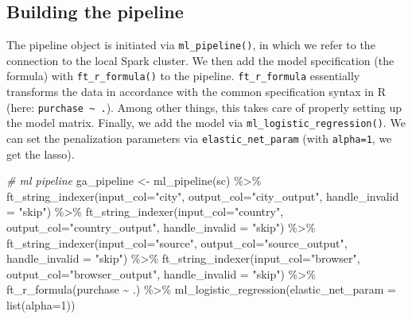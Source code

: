 \documentclass[
  12pt,
]{style/krantz}
\newenvironment{Shaded}{\begin{snugshade}}{\end{snugshade}}
\newcommand{\AttributeTok}[1]{\textcolor[rgb]{0.77,0.63,0.00}{#1}}
\newcommand{\CommentTok}[1]{\textcolor[rgb]{0.56,0.35,0.01}{\textit{#1}}}
\newcommand{\DecValTok}[1]{\textcolor[rgb]{0.00,0.00,0.81}{#1}}
\newcommand{\FunctionTok}[1]{\textcolor[rgb]{0.00,0.00,0.00}{#1}}
\newcommand{\NormalTok}[1]{#1}
\newcommand{\OtherTok}[1]{\textcolor[rgb]{0.56,0.35,0.01}{#1}}
\newcommand{\SpecialCharTok}[1]{\textcolor[rgb]{0.00,0.00,0.00}{#1}}
\newcommand{\StringTok}[1]{\textcolor[rgb]{0.31,0.60,0.02}{#1}}
\begin{document}
\hypertarget{building-the-pipeline}{%
\subsection{Building the pipeline}\label{building-the-pipeline}}

The pipeline object is initiated via \texttt{ml\_pipeline()}, in which we refer to the connection to the local Spark cluster. We then add the model specification (the formula) with \texttt{ft\_r\_formula()} to the pipeline. \texttt{ft\_r\_formula} essentially transforms the data in accordance with the common specification syntax in R (here: \texttt{purchase\ \textasciitilde{}\ .}). Among other things, this takes care of properly setting up the model matrix. Finally, we add the model via \texttt{ml\_logistic\_regression()}. We can set the penalization parameters via \texttt{elastic\_net\_param} (with \texttt{alpha=1}, we get the lasso).

\begin{Shaded}
\begin{Highlighting}[]
\CommentTok{\# ml pipeline}
\NormalTok{ga\_pipeline }\OtherTok{\textless{}{-}} 
     \FunctionTok{ml\_pipeline}\NormalTok{(sc) }\SpecialCharTok{\%\textgreater{}\%}
     \FunctionTok{ft\_string\_indexer}\NormalTok{(}\AttributeTok{input\_col=}\StringTok{"city"}\NormalTok{, }
                       \AttributeTok{output\_col=}\StringTok{"city\_output"}\NormalTok{,}
                       \AttributeTok{handle\_invalid =} \StringTok{"skip"}\NormalTok{) }\SpecialCharTok{\%\textgreater{}\%}
     \FunctionTok{ft\_string\_indexer}\NormalTok{(}\AttributeTok{input\_col=}\StringTok{"country"}\NormalTok{, }
                       \AttributeTok{output\_col=}\StringTok{"country\_output"}\NormalTok{,}
                       \AttributeTok{handle\_invalid =} \StringTok{"skip"}\NormalTok{) }\SpecialCharTok{\%\textgreater{}\%}
     \FunctionTok{ft\_string\_indexer}\NormalTok{(}\AttributeTok{input\_col=}\StringTok{"source"}\NormalTok{, }
                       \AttributeTok{output\_col=}\StringTok{"source\_output"}\NormalTok{,}
                       \AttributeTok{handle\_invalid =} \StringTok{"skip"}\NormalTok{) }\SpecialCharTok{\%\textgreater{}\%}
     \FunctionTok{ft\_string\_indexer}\NormalTok{(}\AttributeTok{input\_col=}\StringTok{"browser"}\NormalTok{, }
                       \AttributeTok{output\_col=}\StringTok{"browser\_output"}\NormalTok{,}
                       \AttributeTok{handle\_invalid =} \StringTok{"skip"}\NormalTok{) }\SpecialCharTok{\%\textgreater{}\%}
     \FunctionTok{ft\_r\_formula}\NormalTok{(purchase }\SpecialCharTok{\textasciitilde{}}\NormalTok{ .) }\SpecialCharTok{\%\textgreater{}\%} 
     \FunctionTok{ml\_logistic\_regression}\NormalTok{(}\AttributeTok{elastic\_net\_param =} \FunctionTok{list}\NormalTok{(}\AttributeTok{alpha=}\DecValTok{1}\NormalTok{))}
\end{Highlighting}
\end{Shaded}
\end{document}

